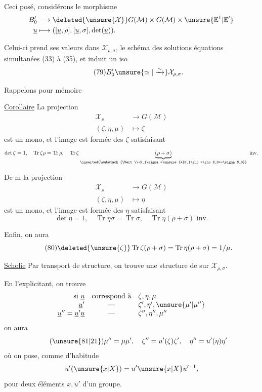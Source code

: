 Ceci posé, considérons le morphisme
\[
\begin{aligned}
B'_0&\longrightarrow\deleted{\unsure{\mathcal X}}G(\mathcal M)\times G(\mathcal M)\times\unsure{\mathbb E^1|\mathbb E'}\\
\underline u&\longmapsto([\underline u,\rho],[\underline u,\sigma],\det(\underline u)).
\end{aligned}
\]


Celui-ci prend ses valeurs dans $\mathcal X_{\rho,\sigma}$, le schéma des solutions  équations simultanées (33) à (35), et induit un iso
\[
\tag{79}B'_0\unsure{\simeq|\xrightarrow{\sim}}\mathcal X_{\rho,\sigma}.
\]

 Rappelons  pour mémoire

\uline{Corollaire} La projection
\[
\begin{aligned}
\mathcal X_\rho&\longrightarrow G(\mathcal M)\\
(\zeta,\eta,\mu)&\longmapsto\zeta
\end{aligned}
\]
est un mono, et l'image est formée des $\zeta$ satisfaisant
\[
\det\zeta=1,\quad \operatorname{Tr}\zeta\rho=\operatorname{Tr}\rho,\quad \operatorname{Tr}\zeta\underbrace{(\rho+\sigma)}_{\inserted{\substack{\Vert\\-N_1\sigma=\unsure{+}N_1\rho=\rho N_0=-\sigma N_0}}}\text{ inv.}
\]

De $\overline{\mathrm m}$ la projection
\[
\begin{aligned}
\mathcal X_\rho&\longrightarrow G(\mathcal M)\\
(\zeta,\eta,\mu)&\longmapsto\eta
\end{aligned}
\]
est un mono, et l'image est formée des $\eta$ satisfaisant
\[
\det\eta=1,\quad\operatorname{Tr}\eta\sigma=\operatorname{Tr}\sigma,\quad\operatorname{Tr}\eta(\rho+\sigma)\text{ inv.}
\]

Enfin, on aura
\[
\tag{80}\deleted{\unsure{\zeta}}\operatorname{Tr}\zeta(\rho+\sigma)=\operatorname{Tr}\eta(\rho+\sigma)=1/\mu.
\]

\uline{Scholie} Par transport de structure, on trouve une structure de  sur $\mathcal X_{\rho,\sigma}$.


En l'explicitant, on trouve
\[
\begin{array}{rcl}
\text{si }\underline u&\text{correspond à}&\zeta,\eta,\mu\\
\underline u'&\text{---}&\zeta',\eta',\unsure{\mu'|\mu''}\\
\underline u''=\underline u'\underline u&\text{---}&\zeta'',\eta'',\mu''
\end{array}
\]
on aura
\[
\tag{\unsure{81|21}}\mu''=\mu\mu',\quad\zeta''=u'(\zeta)\zeta',\quad\eta''=u'(\eta)\eta'
\]
où on pose, comme d'habitude
\[
u'(\unsure{x|X})=u'\unsure{x|X}u'^{-1},
\]
pour deux éléments $x,u'$ d'un groupe.

